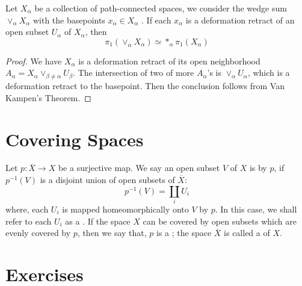 \documentclass[../main.tex]{subfiles}
\begin{document}
\begin{exercise}{}{}
    Let \(  X_{\alpha }  \) be a collection of path-connected spaces, we consider the wedge sum \(  \vee _{\alpha }X_{\alpha }  \) with the basepoints \(  x_{\alpha }\in X_{\alpha }  \) . If each \(  x_{\alpha } \) is a deformation retract     of an open subset \(  U_{\alpha }  \) of \(  X_{\alpha }  \), then \[
     \pi _1 \left( \vee _{\alpha }X_{\alpha } \right)\simeq  *_{\alpha }\pi _1 \left( X_{\alpha } \right) 
    \]  
\end{exercise}

\begin{proof}
    We have \(  X_{\alpha }  \) is a deformation retract of its open neighborhood \(  A_{\alpha }= X_{\alpha }\vee _{\beta \neq \alpha }U_{\beta }  \). The intersection of two of more \(  A_{\alpha }  \)'s is \(  \vee _{\alpha }U_{\alpha }  \), which is a deformation retract to the basepoint. Then the conclusion follows from Van Kampen's Theorem.                                            
\end{proof}

\section{Covering Spaces}

\begin{definition}{}{}
Let \(p:\overline{X} \to X\) be a surjective map. We say an open subset \(V\) of \(X\) is  by \(p\), if \(p^{-1}(V)\) is a disjoint union of open subsets of \(\overline{X}\):
\[
p^{-1}(V)=\coprod_{i} U_i
\]
where, each \(U_i\) is mapped homeomorphically onto \(V\) by \(p\). In this case, we shall refer to each \(U_i\) as a . If the space \(X\) can be covered by open subsets which are evenly covered by \(p\), then we say that, \(p\) is a ; the space \(\overline{X}\) is called a  of \(X\).
\end{definition}

\section{Exercises}
\end{document}
